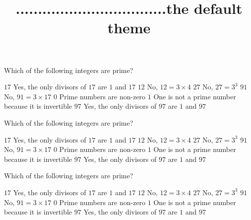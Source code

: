 \documentclass[theme=default]{webquiztex}
\title{..................................the default theme}
\begin{document}
  \begin{question}     %
     Which of the following integers are prime?
     \begin{choice}[multiple, columns=3]
       \correct   $17$ \feedback Yes, the only divisors of $17$ are $1$ and $17$
       \incorrect $12$ \feedback No, $12 = 3\times 4$
       \incorrect $27$ \feedback No, $27=3^3$
       \incorrect $91$ \feedback No, $91 = 3\times 17$
       \incorrect  $0$ \feedback Prime numbers are non-zero
       \incorrect  $1$ \feedback One is not a prime number because it is invertible
       \correct   $97$ \feedback Yes, the only divisors of $97$ are $1$ and $97$
     \end{choice}
  \end{question}

  \begin{question}     %
     Which of the following integers are prime?
     \begin{choice}[multiple, columns=3]
       \correct   $17$ \feedback Yes, the only divisors of $17$ are $1$ and $17$
       \incorrect $12$ \feedback No, $12 = 3\times 4$
       \incorrect $27$ \feedback No, $27=3^3$
       \incorrect $91$ \feedback No, $91 = 3\times 17$
       \incorrect  $0$ \feedback Prime numbers are non-zero
       \incorrect  $1$ \feedback One is not a prime number because it is invertible
       \correct   $97$ \feedback Yes, the only divisors of $97$ are $1$ and $97$
     \end{choice}
  \end{question}

  \begin{question}     %
     Which of the following integers are prime?
     \begin{choice}[multiple, columns=3]
       \correct   $17$ \feedback Yes, the only divisors of $17$ are $1$ and $17$
       \incorrect $12$ \feedback No, $12 = 3\times 4$
       \incorrect $27$ \feedback No, $27=3^3$
       \incorrect $91$ \feedback No, $91 = 3\times 17$
       \incorrect  $0$ \feedback Prime numbers are non-zero
       \incorrect  $1$ \feedback One is not a prime number because it is invertible
       \correct   $97$ \feedback Yes, the only divisors of $97$ are $1$ and $97$
     \end{choice}
  \end{question}
\end{document}
